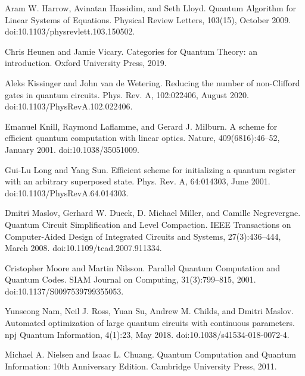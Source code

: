 \par\noindent  [18]  Aram W. Harrow, Avinatan Hassidim, and Seth Lloyd.  Quantum Algorithm for Linear Systems of Equations.  Physical Review Letters, 103(15), October 2009.  doi:10.1103/physrevlett.103.150502.  
 
\par\noindent  [19]  Chris Heunen and Jamie Vicary.  Categories for Quantum Theory: an introduction.  Oxford University Press, 2019.  
 
\par\noindent  [20]  Aleks Kissinger and John van de Wetering.  Reducing the number of non-Clifford gates in quantum circuits.  Phys. Rev. A, 102:022406, August 2020.  doi:10.1103/PhysRevA.102.022406.  
 
\par\noindent  [21]  Emanuel Knill, Raymond Laflamme, and Gerard J. Milburn.  A scheme for efficient quantum computation with linear optics.  Nature, 409(6816):46–52, January 2001.  doi:10.1038/35051009.  
 
\par\noindent  [22]  Gui-Lu Long and Yang Sun.  Efficient scheme for initializing a quantum register with an arbitrary superposed state.  Phys. Rev. A, 64:014303, June 2001.  doi:10.1103/PhysRevA.64.014303.  
 
\par\noindent  [23]  Dmitri Maslov, Gerhard W. Dueck, D. Michael Miller, and Camille Negrevergne.  Quantum Circuit Simplification and Level Compaction.  IEEE Transactions on Computer-Aided Design of Integrated Circuits and Systems, 27(3):436–444, March 2008.  doi:10.1109/tcad.2007.911334.  
 
\par\noindent  [24]  Cristopher Moore and Martin Nilsson.  Parallel Quantum Computation and Quantum Codes.  SIAM Journal on Computing, 31(3):799–815, 2001.  doi:10.1137/S0097539799355053.  
 
\par\noindent  [25]  Yunseong Nam, Neil J. Ross, Yuan Su, Andrew M. Childs, and Dmitri Maslov.  Automated optimization of large quantum circuits with continuous parameters.  npj Quantum Information, 4(1):23, May 2018.  doi:10.1038/s41534-018-0072-4.  
 
\par\noindent  [26]  Michael A. Nielsen and Isaac L. Chuang.  Quantum Computation and Quantum Information: 10th Anniversary Edition.  Cambridge University Press, 2011.  
 
